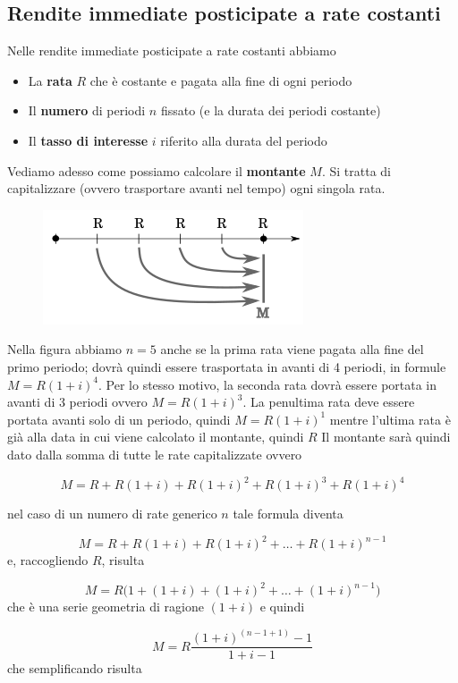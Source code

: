 \subsection{Rendite immediate posticipate a rate costanti}
Nelle rendite immediate posticipate a rate costanti abbiamo 
\begin{itemize}
\item La \textbf{rata} \(R\) che è costante e pagata alla fine di ogni periodo
\item Il \textbf{numero} di periodi \(n\) fissato (e la durata dei periodi 
costante)
\item Il \textbf{tasso di interesse} \(i\) riferito alla durata del periodo
\end{itemize}
Vediamo adesso come possiamo calcolare il \textbf{montante} \(M\). Si tratta 
di capitalizzare (ovvero trasportare avanti nel tempo) ogni singola rata.
\begin{figure}[htp]
\centering
\includegraphics[scale=1]{img/posticipata.png}

\end{figure}

Nella figura abbiamo \(n=5\) anche se la prima rata viene pagata alla fine 
del primo periodo; dovrà quindi essere trasportata in avanti di 4 periodi, 
in formule \(M=R(1+i)^4\). Per lo stesso motivo, la seconda rata dovrà essere 
portata in avanti di 3 periodi ovvero \(M=R(1+i)^3\). La penultima rata deve 
essere portata avanti solo di un periodo, quindi \(M=R(1+i)^1\) mentre 
l'ultima rata è già alla data in cui viene calcolato il montante, quindi 
\(R\) 
Il montante sarà quindi dato dalla somma di tutte le rate capitalizzate 
ovvero

\[M=R+R(1+i)+R(1+i)^2+R(1+i)^3+R(1+i)^4\]

nel caso di un numero di rate generico \(n\) tale formula diventa

\[M=R+R(1+i)+R(1+i)^2+\dots+R(1+i)^{n-1}\]
e, raccogliendo \(R\), risulta

\[M=R\big(1+(1+i)+(1+i)^2+\dots+(1+i)^{n-1}\big)\]
che è una serie geometria di ragione \((1+i)\) e quindi

\[M=R\dfrac{(1+i)^{(n-1+1)}-1}{1+i-1} \]
che semplificando risulta

